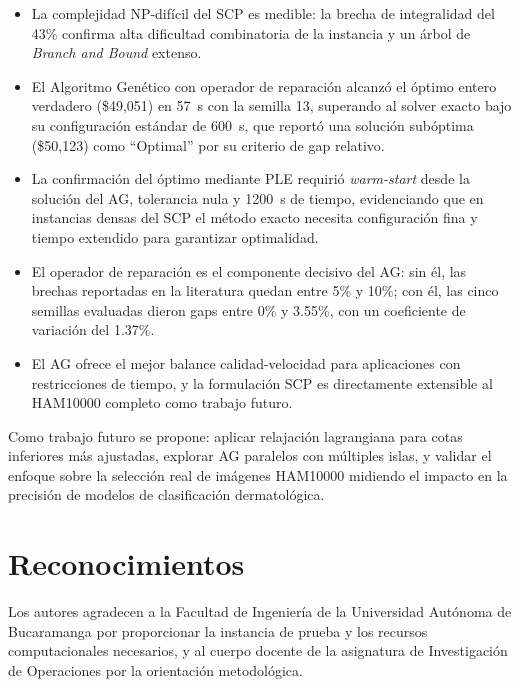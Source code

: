 \documentclass[conference]{IEEEtran}
\begin{document}
\begin{itemize}
\item La complejidad NP-difícil del SCP es medible: la brecha de integralidad del 43\% confirma alta dificultad combinatoria de la instancia y un árbol de \textit{Branch and Bound} extenso.
\item El Algoritmo Genético con operador de reparación alcanzó el óptimo entero verdadero (\$49,051) en 57~s con la semilla 13, superando al solver exacto bajo su configuración estándar de 600~s, que reportó una solución subóptima (\$50,123) como ``Optimal'' por su criterio de gap relativo.
\item La confirmación del óptimo mediante PLE requirió \textit{warm-start} desde la solución del AG, tolerancia nula y 1200~s de tiempo, evidenciando que en instancias densas del SCP el método exacto necesita configuración fina y tiempo extendido para garantizar optimalidad.
\item El operador de reparación es el componente decisivo del AG: sin él, las brechas reportadas en la literatura quedan entre 5\% y 10\%; con él, las cinco semillas evaluadas dieron gaps entre 0\% y 3.55\%, con un coeficiente de variación del 1.37\%.
\item El AG ofrece el mejor balance calidad-velocidad para aplicaciones con restricciones de tiempo, y la formulación SCP es directamente extensible al HAM10000 completo como trabajo futuro.
\end{itemize}

Como trabajo futuro se propone: aplicar relajación lagrangiana \cite{caprara1999} para cotas inferiores más ajustadas, explorar AG paralelos con múltiples islas, y validar el enfoque sobre la selección real de imágenes HAM10000 midiendo el impacto en la precisión de modelos de clasificación dermatológica.

\section*{Reconocimientos}

Los autores agradecen a la Facultad de Ingeniería de la Universidad Autónoma de Bucaramanga por proporcionar la instancia de prueba y los recursos computacionales necesarios, y al cuerpo docente de la asignatura de Investigación de Operaciones por la orientación metodológica.
\end{document}
